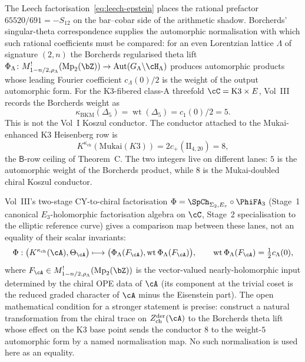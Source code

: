 \begin{remark}
\label{rem:arith-shad-11}%
%
%
%
The Leech factorisation~\eqref{eq:leech-epstein} places the rational
prefactor $65520/691 = -S_{12}$ on the bar--cobar side of the
arithmetic shadow. Borcherds' singular-theta correspondence
\cite{Borcherds1998,Bruinier2002} supplies the automorphic
normalisation with which such rational coefficients must be compared:
for an even Lorentzian lattice
$\Lambda$ of signature $(2, n)$ the Borcherds regularised theta lift
$\Phi_\Lambda \colon M^!_{1 - n/2, \rho_\Lambda}(\mathrm{Mp}_2(\bZ))
\to \operatorname{Aut}(G_\Lambda \backslash \cH_\Lambda)$
produces automorphic products whose leading Fourier coefficient
$c_\Lambda(0)/2$ is the weight of the output automorphic form.
For the K3-fibered class-A threefold
$\cC = \mathrm{K3} \times E$, Vol~III records the Borcherds
weight as
\[
 \kappa_{\mathrm{BKM}}(\Delta_5)
 = \operatorname{wt}(\Delta_5)
 = c_1(0)/2
 = 5.
\]
This is not the Vol~I Koszul conductor. The conductor attached to
the Mukai-enhanced K3 Heisenberg row is
\[
 K^{\kappa_{\mathrm{ch}}}(\mathrm{Mukai}(K3))
 = 2c_+(\mathrm{II}_{4,20})
 = 8,
\]
the $\mathsf B$-row ceiling of Theorem~C. The two integers live on
different lanes: $5$ is the automorphic weight of the Borcherds
product, while $8$ is the Mukai-doubled chiral Koszul conductor.

Vol~III's two-stage CY-to-chiral factorisation
$\Phi = \SpCh_{\Sigma_2, E_\tau} \circ \PhiFA_3$
(Stage~1 canonical $E_3$-holomorphic factorisation algebra on $\cC$,
Stage~2 specialisation to the elliptic reference curve) gives a
comparison map between these lanes, not an equality of their scalar
invariants:
\begin{equation}\label{eq:phi-trace-universal}
 \Phi:
 \bigl(K^{\kappa_{\mathrm{ch}}}(\cA),\Theta_\cA\bigr)
 \longmapsto
 \bigl(\Phi_\Lambda(F_\cA),\operatorname{wt}\Phi_\Lambda(F_\cA)\bigr),
 \qquad
 \operatorname{wt}\Phi_\Lambda(F_\cA)=\tfrac12 c_\Lambda(0),
\end{equation}
where $F_\cA \in M^!_{1 - n/2, \rho_\Lambda}(\mathrm{Mp}_2(\bZ))$ is
the vector-valued nearly-holomorphic input determined by the chiral
OPE data of $\cA$ (its component at the trivial coset is the reduced
graded character of $\cA$ minus the Eisenstein part).
The open mathematical condition for a stronger statement is precise:
construct a natural transformation from the chiral trace on
$Z^{\mathrm{der}}_{\mathrm{ch}}(\cA)$ to the Borcherds theta lift
whose effect on the K3 base point sends the conductor $8$ to the
weight-$5$ automorphic form by a named normalisation map. No such
normalisation is used here as an equality.


\end{remark}
